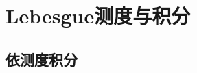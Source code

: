 \chapter{Lebesgue测度与积分}\label{第二章}

\begin{introduction}
    \item 
\end{introduction}


\section{}


\subsection{}

\subsection{}





\section{}


\subsection{}

\subsection{}






\section{依测度积分}\label{依测度积分}


\subsection{}

\subsection{}






\section{}


\subsection{}

\subsection{}